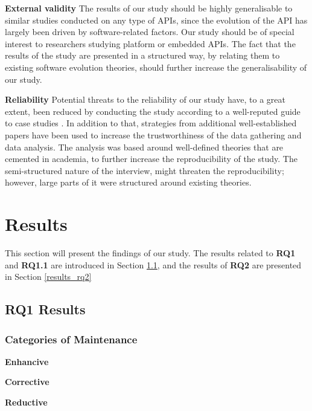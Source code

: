 \documentclass{sig-alternate}
\begin{document}
\smallskip \noindent
\textbf{External validity  } The results of our study should be highly generalisable to similar studies conducted on any type of APIs, since the evolution of the API has largely been driven by software-related factors. Our study should be of special interest to researchers studying platform or embedded APIs. The fact that the results of the study are presented in a structured way, by relating them to existing software evolution theories, should further increase the generalisability of our study.

\smallskip \noindent
\textbf{Reliability  } Potential threats to the reliability of our study have, to a great extent, been reduced by conducting the study according to a well-reputed guide to case studies \cite{runeson2009guidelines}. In addition to that, strategies from additional well-established papers \cite{andersson2007spiral} \cite{seaman1999qualitative} \cite{robson2002real} have been used to increase the trustworthiness of the data gathering and data analysis. The analysis was based around well-defined theories that are cemented in academia, to further increase the reproducibility of the study. The semi-structured nature of the interview, might threaten the reproducibility; however, large parts of it were structured around existing theories. 


\section{Results} \label{results} 
This section will present the findings of our study. The results related to \textbf{RQ1} and \textbf{RQ1.1} are introduced in Section \ref{results_rq1}, and the results of \textbf{RQ2} are presented in Section \ref{results_rq2}


\subsection{RQ1 Results} \label{results_rq1}

\subsubsection{Categories of Maintenance}



\smallskip \noindent
\textbf{Enhancive  }

\smallskip \noindent
\textbf{Corrective  }

\smallskip \noindent
\textbf{Reductive  }
\end{document}
